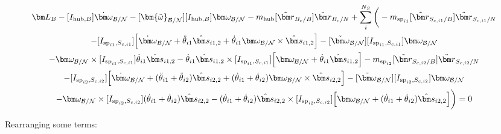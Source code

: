\begin{multline}
	\bm L_B -[I_{\text{hub},B}] \dot{\bm\omega}_{\cal B/N}  -[\bm{\tilde{\omega}}_{\cal B/N}] [I_{\text{hub},B}] \bm\omega_{\cal B/N} - m_{\text{hub}} [\tilde{{\bm r}}_{B_c/B}] \ddot{\bm r}_{B_c/N}
	+ \sum\limits_{i}^{N_S}\bigg(- m_{\text{sp}_{i1}} [\tilde{{\bm r}}_{S_{c,i1}/B}] \ddot{\bm r}_{S_{c,i1}/N} \\
	-[I_{\text{sp}_{i1},S_{c,i1}}] \Big[\dot{\bm \omega}_{\cal{B/N}} + \ddot{\theta}_{i1} \hat{\bm s}_{i1,2} + \dot{\theta}_{i1} \bm \omega_{\cal{B/N}} \times \hat{\bm s}_{i1,2}\Big]
	-[\tilde{\bm \omega}_{\cal{B/N}}] [I_{\text{sp}_{i1},S_{c,i1}}] \bm \omega_{\cal{B/N}} \\
	-\bm \omega_{\cal{B/N}} \times [I_{\text{sp}_{i1},S_{c,i1}}] \dot{\theta}_{i1} \hat{\bm s}_{i1,2} -\dot{\theta}_{i1} \hat{\bm s}_{i1,2} \times [I_{\text{sp}_{i1},S_{c,i1}}] \Big[\bm \omega_{\cal{B/N}} + \dot{\theta}_{i1} \hat{\bm s}_{i1,2}\Big]
	- m_{\text{sp}_{i2}} [\tilde{{\bm r}}_{S_{c,i2}/B}] \ddot{\bm r}_{S_{c,i2}/N} \\
	-[I_{\text{sp}_{i2},S_{c,i2}}] \Big[\dot{\bm \omega}_{\cal{B/N}} + (\ddot{\theta}_{i1}  + \ddot{\theta}_{i2})\hat{\bm s}_{i2,2} + (\dot{\theta}_{i1}  + \dot{\theta}_{i2}) \bm \omega_{\cal{B/N}} \times \hat{\bm s}_{i2,2}\Big]
	-[\tilde{\bm \omega}_{\cal{B/N}}] [I_{\text{sp}_{i2},S_{c,i2}}] \bm \omega_{\cal{B/N}} \\
	-\bm \omega_{\cal{B/N}} \times [I_{\text{sp}_{i2},S_{c,i2}}] (\dot{\theta}_{i1}  + \dot{\theta}_{i2})\hat{\bm s}_{i2,2} -(\dot{\theta}_{i1}  + \dot{\theta}_{i2})\hat{\bm s}_{i2,2} \times [I_{\text{sp}_{i2},S_{c,i2}}] \Big[\bm \omega_{\cal{B/N}} + (\dot{\theta}_{i1}  + \dot{\theta}_{i2})\hat{\bm s}_{i2,2}\Big]\bigg) = 0
\end{multline}

Rearranging some terms:

